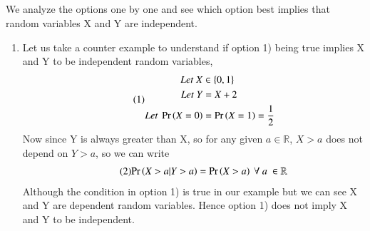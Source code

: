 \documentclass[journal,12pt,twocolumn]{IEEEtran}
\begin{document}
\subsection*{}
We analyze the options one by one and see which option best implies that random variables X and Y are independent. \\
\begin{enumerate}
    \item Let us take a counter example to understand if option 1) being true implies X and Y to be independent random variables, 
\begin{align}\tag{1}
    \begin{split}
        Let\ X &\in \{0, 1\}\\
        Let\ Y &= X + 2\\
        Let\ \Pr\left(X=0\right) &= \Pr\left(X=1\right) = \dfrac{1}{2}\\
    \end{split}
\end{align}
Now since Y is always greater than X, so for any given $a\in \mathbb{R}$, $X > a$ does not depend on $Y > a$, so we can write
\begin{align}\tag{2}
    \begin{split}
        \Pr\left(X>a|Y>a\right) = \Pr\left(X>a\right)\ \forall\ a\ \in \mathbb{R}
    \end{split}
\end{align}
Although the condition in option 1) is true in our example but we can see X and Y are dependent random variables. Hence option 1) does not imply X and Y to be independent.\\


\end{enumerate}
\end{document}
